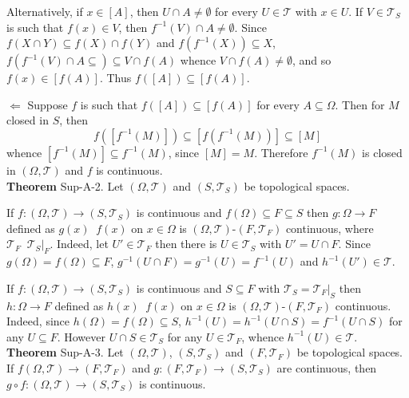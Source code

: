 \documentclass[a4paper]{article}
\newcommand{\clo}[1]{\left [ #1 \right ]}
\newcommand{\brac}[1]{\left ( #1 \right )}
\newcommand{\induc}[1]{\left . #1 \right \vert}
\newcommand{\Tcal}{\mathcal{T}}
\newcommand{\defn}{\mathop{\overset{\Delta}{=}}\nolimits}
\begin{document}
Alternatively, if $x\in \clo{A}$, then $U\cap A\neq \emptyset$ for every $U\in \Tcal$ with $x\in U$. If $V\in \Tcal_S$ is such that $f\brac{x}\in V$, then $f^{-1}\brac{V}\cap A\neq \emptyset$. Since $f\brac{X\cap Y}\subseteq f\brac{X}\cap f\brac{Y}$ and $f\brac{f^{-1}\brac{X}}\subseteq X$, $f\brac{f^{-1}\brac{V}\cap A\subseteq}\subseteq V\cap f\brac{A}$ whence $V\cap f\brac{A} \neq \emptyset$, and so $f\brac{x}\in \clo{f\brac{A}}$. Thus $f\brac{\clo{A}}\subseteq \clo{f\brac{A}}$.

$\Leftarrow$ Suppose $f$ is such that $f\brac{\clo{A}}\subseteq \clo{f\brac{A}}$ for every $A\subseteq \Omega$. Then for $M$ closed in $S$, then \[f\brac{\clo{f^{-1}\brac{M}}}\subseteq \clo{f\brac{f^{-1}\brac{M}}}\subseteq \clo{M}\] whence $\clo{f^{-1}\brac{M}}\subseteq f^{-1}\brac{M}$, since $\clo{M}=M$. Therefore $f^{-1}\brac{M}$ is closed in $\brac{\Omega,\Tcal}$ and $f$ is continuous.\\

\label{thm:cont_prop_2} \noindent \textbf{Theorem} Sup-A-2.
Let $\brac{\Omega,\Tcal}$ and $\brac{S,\Tcal_S}$ be topological spaces.

If $f:\brac{\Omega, \Tcal}\to\brac{S, \Tcal_S}$ is continuous and $f\brac{\Omega} \subseteq F\subseteq S$ then $g:\Omega\to F$ defined as $g\brac{x}\defn f\brac{x}$ on $x\in \Omega$ is $\brac{\Omega, \Tcal}$-$\brac{F, \Tcal_F}$ continuous, where $\Tcal_F\defn \induc{\Tcal_S}_F$. Indeed, let $U'\in \Tcal_F$ then there is $U\in \Tcal_S$ with $U'=U\cap F$. Since $g\brac{\Omega} = f\brac{\Omega}\subseteq F$, $g^{-1}\brac{U\cap F} = g^{-1}\brac{U} = f^{-1}\brac{U}$ and $h^{-1}\brac{U'}\in \Tcal$.

If $f:\brac{\Omega, \Tcal}\to\brac{S, \Tcal_S}$ is continuous and $S\subseteq F$ with $\Tcal_S = \induc{\Tcal_F}_S$ then $h:\Omega\to F$ defined as $h\brac{x}\defn f\brac{x}$ on $x\in \Omega$ is $\brac{\Omega, \Tcal}$-$\brac{F, \Tcal_F}$ continuous. Indeed, since $h\brac{\Omega} = f\brac{\Omega}\subseteq S$, $h^{-1}\brac{U} = h^{-1}\brac{U\cap S} = f^{-1}\brac{U\cap S}$ for any $U\subseteq F$. However $U\cap S\in \Tcal_S$ for any $U\in \Tcal_F$, whence $h^{-1}\brac{U}\in \Tcal$.\\

\label{thm:cont_comp} \noindent \textbf{Theorem} Sup-A-3.
Let $\brac{\Omega,\Tcal}$, $\brac{S,\Tcal_S}$ and $\brac{F,\Tcal_F}$ be topological spaces. If $f\brac{\Omega,\Tcal}\to\brac{F,\Tcal_F}$ and $g:\brac{F,\Tcal_F}\to \brac{S,\Tcal_S}$ are continuous, then $g\circ f:\brac{\Omega,\Tcal}\to\brac{S,\Tcal_S}$ is continuous.
\end{document}
